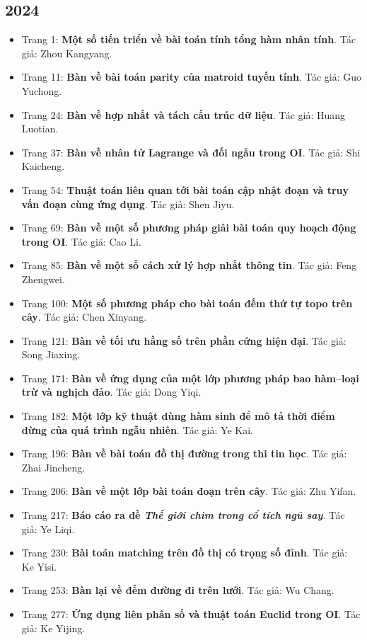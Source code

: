 \documentclass[11pt]{article}
\begin{document}
\subsection{2024}
\begin{itemize}[leftmargin=2em]
  \item Trang 1: \textbf{Một số tiến triển về bài toán tính tổng hàm nhân tính}. Tác giả: Zhou Kangyang.
  \item Trang 11: \textbf{Bàn về bài toán parity của matroid tuyến tính}. Tác giả: Guo Yuchong.
  \item Trang 24: \textbf{Bàn về hợp nhất và tách cấu trúc dữ liệu}. Tác giả: Huang Luotian.
  \item Trang 37: \textbf{Bàn về nhân tử Lagrange và đối ngẫu trong OI}. Tác giả: Shi Kaicheng.
  \item Trang 54: \textbf{Thuật toán liên quan tới bài toán cập nhật đoạn và truy vấn đoạn cùng ứng dụng}. Tác giả: Shen Jiyu.
  \item Trang 69: \textbf{Bàn về một số phương pháp giải bài toán quy hoạch động trong OI}. Tác giả: Cao Li.
  \item Trang 85: \textbf{Bàn về một số cách xử lý hợp nhất thông tin}. Tác giả: Feng Zhengwei.
  \item Trang 100: \textbf{Một số phương pháp cho bài toán đếm thứ tự topo trên cây}. Tác giả: Chen Xinyang.
  \item Trang 121: \textbf{Bàn về tối ưu hằng số trên phần cứng hiện đại}. Tác giả: Song Jiaxing.
  \item Trang 171: \textbf{Bàn về ứng dụng của một lớp phương pháp bao hàm--loại trừ và nghịch đảo}. Tác giả: Dong Yiqi.
  \item Trang 182: \textbf{Một lớp kỹ thuật dùng hàm sinh để mô tả thời điểm dừng của quá trình ngẫu nhiên}. Tác giả: Ye Kai.
  \item Trang 196: \textbf{Bàn về bài toán đồ thị đường trong thi tin học}. Tác giả: Zhai Jincheng.
  \item Trang 206: \textbf{Bàn về một lớp bài toán đoạn trên cây}. Tác giả: Zhu Yifan.
  \item Trang 217: \textbf{Báo cáo ra đề \emph{Thế giới chìm trong cổ tích ngủ say}}. Tác giả: Ye Liqi.
  \item Trang 230: \textbf{Bài toán matching trên đồ thị có trọng số đỉnh}. Tác giả: Ke Yisi.
  \item Trang 253: \textbf{Bàn lại về đếm đường đi trên lưới}. Tác giả: Wu Chang.
  \item Trang 277: \textbf{Ứng dụng liên phân số và thuật toán Euclid trong OI}. Tác giả: Ke Yijing.

\end{itemize}
\end{document}
